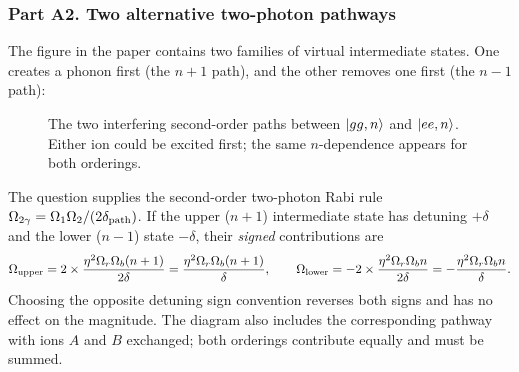 \subsubsection*{Part A2. Two alternative two-photon pathways}
The figure in the paper contains two families of virtual intermediate states. One creates a phonon first (the $n+1$ path), and the other removes one first (the $n-1$ path):
\begin{figure}[htbp]
\centering{}
\caption{The two interfering second-order paths between $\left\lvert gg,n\right\rangle$ and $\left\lvert ee,n\right\rangle$. Either ion could be excited first; the same $n$-dependence appears for both orderings.}
\end{figure}
The question supplies the second-order two-photon Rabi rule $\Omega_{2\gamma}=\Omega_1\Omega_2/(2\delta_{\rm path})$. If the upper ($n+1$) intermediate state has detuning $+\delta$ and the lower ($n-1$) state $-\delta$, their \emph{signed} contributions are
\begin{equation}\label{eq:23MSpaths}
\Omega_{\rm upper}=2\times\frac{\eta^2\Omega_r\Omega_b(n+1)}{2\delta}=\frac{\eta^2\Omega_r\Omega_b(n+1)}{\delta},\qquad
\Omega_{\rm lower}=-2\times\frac{\eta^2\Omega_r\Omega_b n}{2\delta}=-\frac{\eta^2\Omega_r\Omega_b n}{\delta}.
\end{equation}
Choosing the opposite detuning sign convention reverses both signs and has no effect on the magnitude. The diagram also includes the corresponding pathway with ions $A$ and $B$ exchanged; both orderings contribute equally and must be summed.

